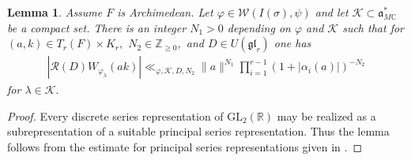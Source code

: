 \documentclass[12pt]{amsart}
\newtheorem{lem}[thm]{Lemma}
\theoremstyle{remark}
\numberwithin{equation}{section}
\newcommand{\GL}{\mathrm{GL}}
\newcommand{\ZZ}{\mathbb{Z}}
\newcommand{\CC}{\mathbb{C}}
\newcommand{\RR}{\mathbb{R}}
\theoremstyle{definition}
\numberwithin{equation}{subsection}
\newcommand{\norm}[1]{\lVert#1\rVert}
\begin{document}
\begin{lem} \label{lem:Arch:Whitt:fam:bound}
Assume $F$ is Archimedean.  Let $\varphi \in \mathcal{W}(I(\sigma),\psi)$ and let $\mathcal{K} \subset \mathfrak{a}_{M\CC}^{*}$ be a compact set.  There is an integer $N_1>0$ depending on $\varphi$ and $\mathcal{K}$ such that 
for $(a,k) \in  T_r(F) \times K_r,$ $N_2\in \ZZ_{\geq 0},$  and $D \in U(\mathfrak{gl}_r)$ 
one has 
\begin{align*}
|\mathcal{R}(D)W_{\varphi_\lambda}(ak)| \ll_{\varphi,\mathcal{K},D,N_2} \norm{a}^{N_1}\prod_{i=1}^{r-1}(1+|\alpha_i(a)|)^{-N_2}
\end{align*}
for $\lambda \in \mathcal{K}.$   
\end{lem}
\begin{proof}
Every discrete series representation of $\GL_2(\RR)$ may be realized as a subrepresentation of a suitable principal series representation.  Thus the lemma follows from the estimate for principal series representations given in \cite[Proposition 3.3]{JacquetPerfectRS}.   
\end{proof}
\end{document}
